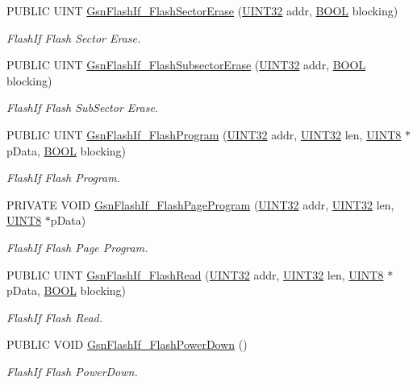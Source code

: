 \begin{DoxyCompactItemize}
PUBLIC UINT \hyperlink{a00647_ga204ff2b722664894838958d449b76f0d}{GsnFlashIf\_\-FlashSectorErase} (\hyperlink{a00660_gae1e6edbbc26d6fbc71a90190d0266018}{UINT32} addr, \hyperlink{a00660_ga1f04022c0a182c51c059438790ea138c}{BOOL} blocking)
\begin{DoxyCompactList}\small\item\em FlashIf Flash Sector Erase. \end{DoxyCompactList}\item 
PUBLIC UINT \hyperlink{a00647_gaba565cfc9046eef09ab9934e687f6044}{GsnFlashIf\_\-FlashSubsectorErase} (\hyperlink{a00660_gae1e6edbbc26d6fbc71a90190d0266018}{UINT32} addr, \hyperlink{a00660_ga1f04022c0a182c51c059438790ea138c}{BOOL} blocking)
\begin{DoxyCompactList}\small\item\em FlashIf Flash SubSector Erase. \end{DoxyCompactList}\item 
PUBLIC UINT \hyperlink{a00647_ga3998be9c292aba1e22142a3987b5f5c8}{GsnFlashIf\_\-FlashProgram} (\hyperlink{a00660_gae1e6edbbc26d6fbc71a90190d0266018}{UINT32} addr, \hyperlink{a00660_gae1e6edbbc26d6fbc71a90190d0266018}{UINT32} len, \hyperlink{a00660_gab27e9918b538ce9d8ca692479b375b6a}{UINT8} $\ast$pData, \hyperlink{a00660_ga1f04022c0a182c51c059438790ea138c}{BOOL} blocking)
\begin{DoxyCompactList}\small\item\em FlashIf Flash Program. \end{DoxyCompactList}\item 
PRIVATE VOID \hyperlink{a00647_ga0df0295551b38ea8a75b6bbfa748cde4}{GsnFlashIf\_\-FlashPageProgram} (\hyperlink{a00660_gae1e6edbbc26d6fbc71a90190d0266018}{UINT32} addr, \hyperlink{a00660_gae1e6edbbc26d6fbc71a90190d0266018}{UINT32} len, \hyperlink{a00660_gab27e9918b538ce9d8ca692479b375b6a}{UINT8} $\ast$pData)
\begin{DoxyCompactList}\small\item\em FlashIf Flash Page Program. \end{DoxyCompactList}\item 
PUBLIC UINT \hyperlink{a00647_ga3ed4044178d723647df832021c3a609d}{GsnFlashIf\_\-FlashRead} (\hyperlink{a00660_gae1e6edbbc26d6fbc71a90190d0266018}{UINT32} addr, \hyperlink{a00660_gae1e6edbbc26d6fbc71a90190d0266018}{UINT32} len, \hyperlink{a00660_gab27e9918b538ce9d8ca692479b375b6a}{UINT8} $\ast$pData, \hyperlink{a00660_ga1f04022c0a182c51c059438790ea138c}{BOOL} blocking)
\begin{DoxyCompactList}\small\item\em FlashIf Flash Read. \end{DoxyCompactList}\item 
PUBLIC VOID \hyperlink{a00647_ga0fdd893814aead99338aea969b2cfc0a}{GsnFlashIf\_\-FlashPowerDown} ()
\begin{DoxyCompactList}\small\item\em FlashIf Flash PowerDown. \end{DoxyCompactList}\end{DoxyCompactItemize}


